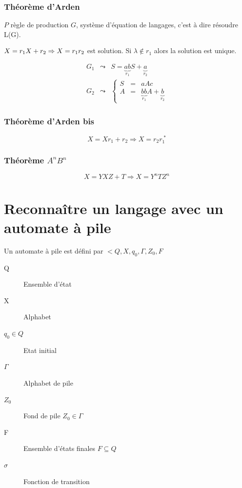 \documentclass[12pt,a4paper,openany]{book}
\begin{document}
	\subsubsection{Théorème d'Arden}
	$P$ règle de production $G$, système d'équation de langages, c'est à dire résoudre L(G).

	$X =  r_1 X + r_2 \Rightarrow X = r_1\* r_2$ est solution. Si $\lambda \not\in r_1$ alors la solution est unique.
	\begin{exemple}
		\begin{eqnarray*}
			G_1 &\leadsto& S = \underbrace{ab}_{r_1}S + \underbrace{a}_{r_2}\\
			G_2 &\leadsto& \left\{\begin{array}{ccc} S& =& aAc\\
				A& =& \underbrace{bb}_{r_1}A+\underbrace{b}_{r_2}\end{array}\right.
			\end{eqnarray*}
		\end{exemple}

		\subsubsection{Théorème d'Arden bis}
		$$X = Xr_1+r_2 \Rightarrow X=r_2r_1^{\;*}$$

		\subsubsection{Théorème $A^nB^n$}
		$$X = YXZ+T \Rightarrow X = Y^nTZ^n$$

		\section{Reconnaître un langage avec un automate à pile}
		Un automate à pile est défini par $<Q,X,q_0,\Gamma, Z_0,F$
		\begin{description}
			\item[Q] Ensemble d'état
			\item[X] Alphabet
			\item[$q_0 \in Q$] Etat initial
			\item[$\Gamma$] Alphabet de pile
			\item[$Z_0$] Fond de pile $Z_0 \in \Gamma$
			\item[F] Ensemble d'états finales $F\subseteq Q$
			\item[$\sigma$] Fonction de transition 
		\end{description}
\end{document}

